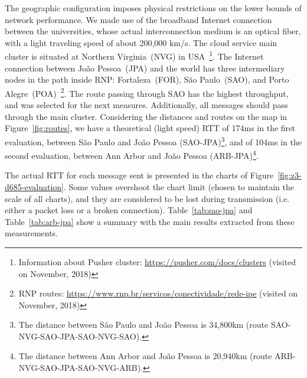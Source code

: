 The geographic configuration imposes physical restrictions on the lower bounds of network performance.
We made use of the broadband Internet connection between the universities, whose actual interconnection medium is an optical fiber, with a light traveling speed of about 200,000 km/s.
The cloud service main cluster is situated at Northern Virginia~(NVG) in USA~\footnote{Information about Pusher cluster: \url{https://pusher.com/docs/clusters} (visited on November, 2018)}.
The Internet connection between Jo\~{a}o Pessoa~(JPA) and the world has three intermediary nodes in the path inside RNP: Fortaleza~(FOR), S\~{a}o Paulo~(SAO), and Porto Alegre~(POA)~\footnote{RNP routes: \url{https://www.rnp.br/servicos/conectividade/rede-ipe} (visited on November, 2018)}.
The route passing through SAO has the highest throughput, and was selected for the next measures.
Additionally, all messages should pass through the main cluster.
Considering the distances and routes on the map in Figure~\ref{fig:routes}, we have a theoretical (light speed) RTT of 174ms in the first evaluation, between S\~{a}o Paulo and Jo\~{a}o Pessoa (SAO-JPA)\footnote{The distance between S\~{a}o Paulo and Jo\~{a}o Pessoa is 34,800km (route SAO-NVG-SAO-JPA-SAO-NVG-SAO).}, and of 104ms in the second evaluation, between Ann Arbor and Jo\~{a}o Pessoa (ARB-JPA)\footnote{The distance between Ann Arbor and Jo\~{a}o Pessoa is 20,940km (route ARB-NVG-SAO-JPA-SAO-NVG-ARB).}.


The actual RTT for each message sent is presented in the charts of Figure~\ref{fig:z3-d685-evaluation}.
Some values overshoot the chart limit (chosen to maintain the scale of all charts), and they are considered to be lost during transmission (i.e. either a packet loss or a broken connection). 
Table~\ref{tab:sao-jpa} and Table~\ref{tab:arb-jpa} show a summary with the main results extracted from these measurements.


